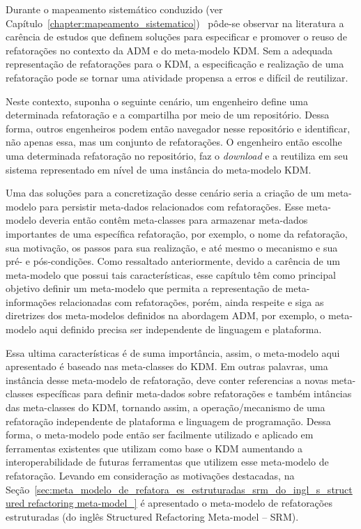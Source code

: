 Durante o mapeamento sistemático conduzido (ver Capítulo~\ref{chapter:mapeamento_sistematico})~\cite{durelli_systematic_mapping} pôde-se observar na literatura a carência de estudos que definem soluções para especificar e promover o reuso de refatorações no contexto da ADM e do meta-modelo KDM. Sem a adequada representação de refatorações para o KDM, a especificação e realização de uma refatoração pode se tornar uma atividade propensa a erros e difícil de reutilizar.

Neste contexto, suponha o seguinte cenário, um engenheiro define uma determinada refatoração e a compartilha por meio de um repositório. Dessa forma, outros engenheiros podem então navegador nesse repositório e identificar, não apenas essa, mas um conjunto de refatorações. O engenheiro então escolhe uma determinada refatoração no repositório, faz o \textit{download} e a reutiliza em seu sistema representado em nível de uma instância do meta-modelo KDM. 

Uma das soluções para a concretização desse cenário seria a criação de um meta-modelo para persistir meta-dados relacionados com refatorações. Esse meta-modelo deveria então contêm meta-classes para armazenar meta-dados importantes de uma específica refatoração, por exemplo, o nome da refatoração, sua motivação, os passos para sua realização, e até mesmo o mecanismo e sua pré- e pós-condições. Como ressaltado anteriormente, devido a carência de um meta-modelo que possui tais características, esse capítulo têm como principal objetivo definir um meta-modelo que permita a representação de meta-informações relacionadas com refatorações, porém, ainda respeite e siga as diretrizes dos meta-modelos definidos na abordagem ADM, por exemplo, o meta-modelo aqui definido precisa ser independente de linguagem e plataforma.

Essa ultima características é de suma importância, assim, o meta-modelo aqui apresentado é baseado nas meta-classes do KDM. Em outras palavras, uma instância desse meta-modelo de refatoração, deve conter referencias a novas meta-classes específicas para definir meta-dados sobre refatorações e também intâncias das meta-classes do KDM, tornando assim, a operação/mecanismo de uma refatoração independente de plataforma e linguagem de programação. Dessa forma, o meta-modelo pode então ser facilmente utilizado e aplicado em ferramentas existentes que utilizam como base o KDM aumentando a interoperabilidade de futuras ferramentas que utilizem esse meta-modelo de refatoração. Levando em consideração as motivações destacadas, na Seção~\ref{sec:meta_modelo_de_refatora_es_estruturadas_srm_do_ingl_s_structured refactoring meta-model_} é apresentado o meta-modelo de refatorações estruturadas (do inglês Structured Refactoring Meta-model – SRM).  


